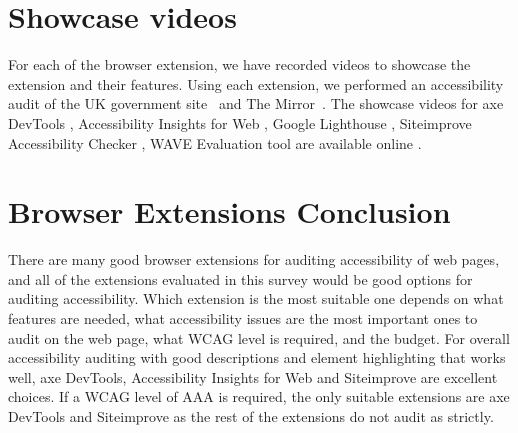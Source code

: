 \section{Showcase videos}
For each of the browser extension, we have recorded videos to showcase the extension and their features.
Using each extension, we performed an accessibility audit of the UK government site~\parencite{GovUK} and The Mirror~\parencite{MirrorUK}.
The showcase videos for axe DevTools \parencite{axe_ext_vid}, Accessibility Insights for Web \parencite{aiweb_ext_vid}, Google Lighthouse \parencite{lighthouse_ext_vid}, Siteimprove Accessibility Checker \parencite{siteimprove_ext_vid}, WAVE Evaluation tool are available online \parencite{wave_ext_vid}.

\section{Browser Extensions Conclusion}
There are many good browser extensions for auditing accessibility of web pages, and all of the extensions evaluated in this survey would be good options for auditing accessibility.
Which extension is the most suitable one depends on what features are needed, what accessibility issues are the most important ones to audit on the web page, what WCAG level is required, and the budget.
For overall accessibility auditing with good descriptions and element highlighting that works well, axe DevTools, Accessibility Insights for Web and Siteimprove are excellent choices.
If a WCAG level of AAA is required, the only suitable extensions are axe DevTools and Siteimprove as the rest of the extensions do not audit as strictly.

